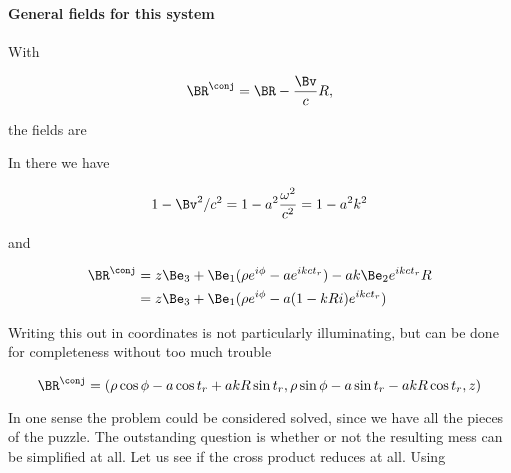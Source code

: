 {\paragraph{General fields for this system}

With 

\begin{equation}\label{eqn:relativisticElectrodynamicsExamReflection:540}
\BR^\conj = \BR - \frac{\Bv}{c} R,
\end{equation}

the fields are


In there we have

\begin{equation}\label{eqn:relativisticElectrodynamicsExamReflection:580}
1 - \Bv^2/c^2 = 1 - a^2 \frac{\omega^2}{c^2} = 1 - a^2 k^2
\end{equation}

and

\begin{equation}\label{eqn:relativisticElectrodynamicsExamReflection:1090}
\begin{aligned}
\BR^\conj 
&= 
z \Be_3 + \Be_1 (\rho e^{i \phi} - a e^{i k c t_r} )
-
a k \Be_2 e^{i k c t_r} R \\
&= 
z \Be_3 + \Be_1 (\rho e^{i \phi} - a (1 - k R i) e^{i k c t_r} )
\end{aligned}
\end{equation}

Writing this out in coordinates is not particularly illuminating, but can be done for completeness without too much trouble

\begin{equation}\label{eqn:relativisticElectrodynamicsExamReflection:600}
\BR^\conj = 
( \rho \cos\phi - a \cos t_r + a k R \sin t_r,
  \rho \sin\phi - a \sin t_r - a k R \cos t_r,
  z )
\end{equation}

In one sense the problem could be considered solved, since we have all the pieces of the puzzle.  The outstanding question is whether or not the resulting mess can be simplified at all.  Let us see if the cross product reduces at all.  Using

}
